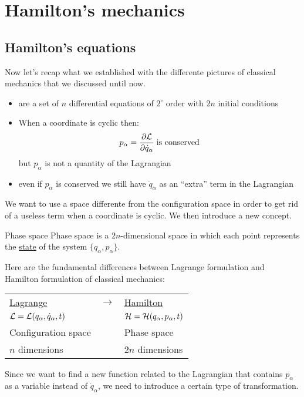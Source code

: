 \chapter{Hamilton's mechanics}
\section{Hamilton's equations}
Now let's recap what we established with the differente pictures of classical mechanics that we discussed until now.
\begin{itemize}
    \item \eleref\;are a set of $n$ differential equations of $2^\circ$ order with $2n$ initial conditions
    \item When a coordinate is cyclic then: \begin{equation}
        p_{\alpha} = \pdv{\lagr}{\dot{q}_{\alpha}}\;\text{is conserved}
    \end{equation}
    but $p_{\alpha}$ is not a quantity of the Lagrangian
    \item even if $p_\alpha$ is conserved we still have $\dot{q}_{\alpha}$ as an ``extra'' term in the Lagrangian
\end{itemize}
We want to use a space differente from the configuration space in order to get rid of a useless term when a coordinate is cyclic. We then introduce a new concept.
\begin{definition}{Phase space}
  Phase space is a $2n$-dimensional space in which each point represents the \underline{state} of the system $\{q_{\alpha},p_{\alpha}\}$.
\end{definition}
Here are the fundamental differences between Lagrange formulation and Hamilton formulation of classical mechanics:
\begin{table}[H]
    \centering
    \begin{tabular}{lll}
        \underline{Lagrange} & $\longrightarrow$ &\underline{Hamilton}\\[8pt]
        $\mathcal{L}=\mathcal{L}(q_{\alpha},\dot{q}_{\alpha},t)$ & &$\mathcal{H}=\mathcal{H}(q_{\alpha},p_{\alpha},t)$\\[8pt]
        Configuration space & &Phase space\\[8pt]
        $n$ dimensions & &$2n$ dimensions
    \end{tabular}
\end{table}
Since we want to find a new function related to the Lagrangian that contains $p_{\alpha}$ as a variable instead of $\dot{q}_{\alpha}$, we need to introduce a certain type of transformation.\\
